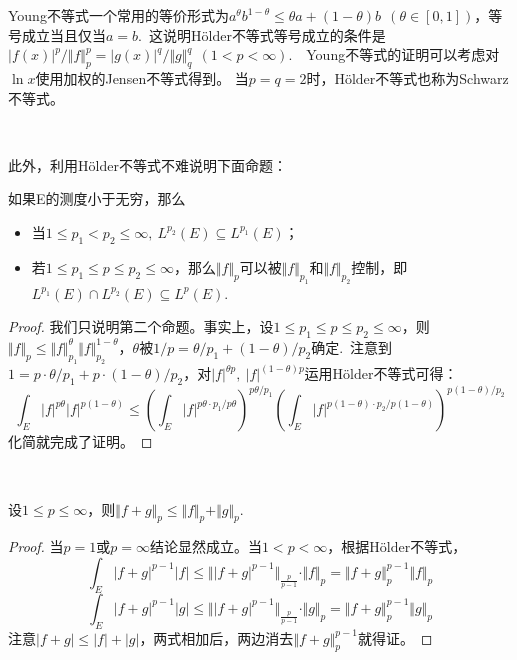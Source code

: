 \documentclass[color=green,thmcnt=section,lang=cn,12pt]{elegantbook}
\numberwithin{equation}{section}%
\numberwithin{figure}{section}%
\newcommand{\normp}[2]{\Vert #1 \Vert_{#2}}
\newcommand{\holder}{\textrm{Hölder}}
\begin{document}
\begin{remark}
    Young不等式一个常用的等价形式为$a^\theta b^{1-\theta}\leq \theta a+(1-\theta)b\ \ (\theta\in[0,1])$，等号成立当且仅当$a=b$.\  
    这说明$\holder$不等式等号成立的条件是$|f(x)|^p/\normp{f}{p}^p=|g(x)|^q/\normp{g}{q}^q\ \ (1<p<\infty)$.\ \ Young不等式的证明可以考虑对$\ln x$使用加权的Jensen不等式得到。
    当$p=q=2$时，$\holder$不等式也称为Schwarz不等式。
\end{remark}
\ 


此外，利用$\holder$不等式不难说明下面命题：
\begin{proposition}
    如果E的测度小于无穷，那么
    \begin{itemize}
        \item 当$1\leq p_1<p_2\leq \infty,\ L^{p_2}(E)\subseteq L^{p_1}(E)$；
        \item 若$1\leq p_1\leq p\leq p_2\leq \infty$，那么$\normp{f}{p}$可以被$\normp{f}{p_1}$和$\normp{f}{p_2}$控制，即$L^{p_1}(E)\cap L^{p_2}(E)\subseteq L^{p}(E)$.
        \end{itemize}
\end{proposition}

    \begin{proof}
        我们只说明第二个命题。事实上，设$1\leq p_1\leq p\leq p_2\leq \infty$，则$\normp{f}{p}\leq \normp{f}{p_1}^\theta\normp{f}{p_2}^{1-\theta}$，$\theta$被$1/p=\theta/p_1+(1-\theta)/p_2$确定.\ 
    注意到$1=p\cdot \theta/p_1+p\cdot (1-\theta)/p_2$，对$|f|^{\theta p},\ |f|^{(1-\theta) p}$运用$\holder$不等式可得：
    \begin{equation*}
        \int_E|f|^{p\theta}|f|^{p(1-\theta)}\leq (\int_E|f|^{p\theta\cdot p_1/p\theta})^{p\theta/p_1}(\int_E|f|^{p(1-\theta)\cdot p_2/p(1-\theta)})^{p(1-\theta)/p_2}
    \end{equation*}
    化简就完成了证明。
    \end{proof}
\ 


\begin{theorem}[Minkowski不等式]\label{minkowskithm}
    设$1\leq p\leq\infty$，则$\normp{f+g}{p}\leq \normp{f}{p}+\normp{g}{p}$.
\end{theorem}
\begin{proof}
    当$p=1$或$p=\infty$结论显然成立。当$1<p<\infty$，根据$\holder$不等式，
    \begin{equation*}
        \int_E|f+g|^{p-1}|f|\leq \normp{|f+g|^{p-1}}{\frac{p}{p-1}}\cdot \normp{f}{p}=\normp{f+g}{p}^{p-1}\normp{f}{p}
    \end{equation*}
    \begin{equation*}
        \int_E|f+g|^{p-1}|g|\leq \normp{|f+g|^{p-1}}{\frac{p}{p-1}}\cdot \normp{g}{p}=\normp{f+g}{p}^{p-1}\normp{g}{p}
    \end{equation*}
    注意$|f+g|\leq |f|+|g|$，两式相加后，两边消去$\normp{f+g}{p}^{p-1}$就得证。
\end{proof}
\ 
\end{document}
